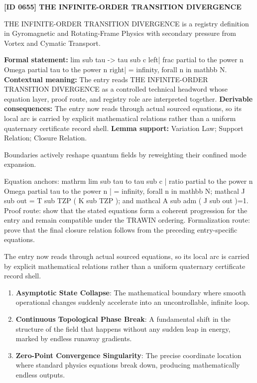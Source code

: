 \clearpage
\noindent\textbf{[ID 0655] THE INFINITE-ORDER TRANSITION DIVERGENCE}\par
\vspace{0.35em}
\begingroup\small
{}
THE INFINITE-ORDER TRANSITION DIVERGENCE is a registry definition in Gyromagnetic and Rotating-Frame Physics with secondary pressure from Vortex and Cymatic Transport.

\begingroup\footnotesize\setlength{\emergencystretch}{3em}\sloppy
\textbf{Formal statement:} lim sub tau -> tau sub c left| frac partial to the power n Omega partial tau to the power n right| = infinity, forall n in mathbb N. \textbf{Contextual meaning:} The entry reads THE INFINITE-ORDER TRANSITION DIVERGENCE as a controlled technical headword whose equation layer, proof route, and registry role are interpreted together. \textbf{Derivable consequences:} The entry now reads through actual sourced equations, so its local arc is carried by explicit mathematical relations rather than a uniform quaternary certificate record shell. \textbf{Lemma support:} Variation Law; Support Relation; Closure Relation.\par
\endgroup

Boundaries actively reshape quantum fields by reweighting their confined mode expansion.

Equation anchors: mathrm lim sub tau to tau sub c | ratio partial to the power n Omega partial tau to the power n | = infinity, forall n in mathbb N; mathcal J sub out = T sub TZP ( K sub TZP ); and mathcal A sub adm ( J sub out )=1. Proof route: show that the stated equations form a coherent progression for the entry and remain compatible under the TRAWIN ordering. Formalization route: prove that the final closure relation follows from the preceding entry-specific equations.

The entry now reads through actual sourced equations, so its local arc is carried by explicit mathematical relations rather than a uniform quaternary certificate record shell.
\endgroup

\begin{enumerate}[leftmargin=1.6em,itemsep=6pt,topsep=4pt]
\item \textbf{Asymptotic State Collapse}: The mathematical boundary where smooth operational changes suddenly accelerate into an uncontrollable, infinite loop.
\item \textbf{Continuous Topological Phase Break}: A fundamental shift in the structure of the field that happens without any sudden leap in energy, marked by endless runaway gradients.
\item \textbf{Zero-Point Convergence Singularity}: The precise coordinate location where standard physics equations break down, producing mathematically endless outputs.
\end{enumerate}

